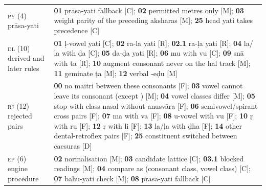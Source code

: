 {\begin{tabularx}{\textwidth}{@{}>{\raggedright\arraybackslash}p{2.6cm}Y@{}}
\textsc{py} (4) prāsa-yati & \textbf{01} prāsa-yati fallback [C]; \textbf{02} permitted metres only [M]; \textbf{03} weight parity of the preceding aksharas [M]; \textbf{25} head yati takes precedence [C] \\
\textsc{dl} (10) derived and later rules & \textbf{01} ḷ-vowel yati [C]; \textbf{02} ra-la yati [R]; \textbf{02.1} ra-ḷa yati [R]; \textbf{04} la/ḷa with ḍa [C]; \textbf{05} da-ḍa yati [R]; \textbf{06} mu with vu [C]; \textbf{09} snā with ta [R]; \textbf{10} augment consonant never on the hal track [M]; \textbf{11} geminate ṭa [M]; \textbf{12} verbal -eḍu [M] \\
\textsc{rj} (12) rejected pairs & \textbf{00} no maitri between these consonants [F]; \textbf{03} vowel cannot leave its consonant (except ) [M]; \textbf{04} vowel classes differ [M]; \textbf{05} stop with class nasal without anusvāra [F]; \textbf{06} semivowel/spirant cross pairs [F]; \textbf{07} ma with va [F]; \textbf{08} u-vowel with vu [F]; \textbf{10} ṛ with ru [F]; \textbf{12} ṛ with li [F]; \textbf{13} la/ḷa with ḍha [F]; \textbf{14} other dental-retroflex pairs [F]; \textbf{25} constituent switched between caesuras [D] \\
\textsc{ep} (6) engine procedure & \textbf{02} normalisation [M]; \textbf{03} candidate lattice [C]; \textbf{03.1} blocked readings [M]; \textbf{04} compare as (consonant class, vowel class) [C]; \textbf{07} bahu-yati check [M]; \textbf{08} prāsa-yati fallback [C] \\
\bottomrule
\end{tabularx}
\label{tab:yatirules}\par}
\medskip
